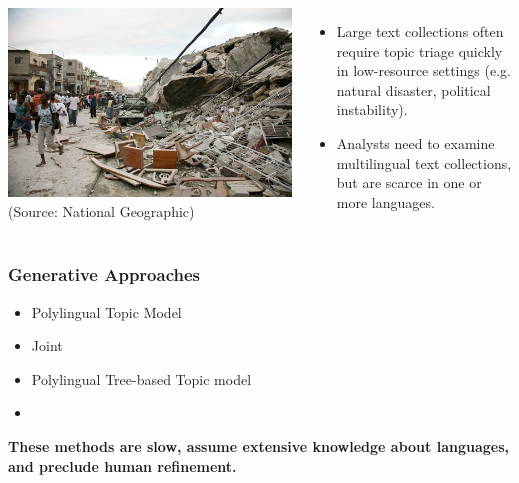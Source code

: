 \begin{frame}

  \begin{columns}
    \includegraphics[width=1.0\linewidth]{topic_models/mtanchor/haiti}
    \tiny (Source: National Geographic)

  
\begin{itemize}
\item Large text collections often require topic triage quickly in low-resource settings (e.g. natural disaster, political instability). 
\item Analysts need to examine multilingual text collections, but are scarce in one or more languages.
\end{itemize}
\end{columns}
\end{frame}


\begin{frame}
  \frametitle{Generative Approaches}
\begin{itemize}
\item Polylingual Topic Model~\cite{mimno-2009}
\item Joint~\cite{jagarlamudi-2010}
\item Polylingual Tree-based Topic model~\cite{hu-2014-ptlda} 
\item {}~\cite{shi-2016} \pause
\vspace{1cm}
\end{itemize}
\textbf{These methods are slow, assume extensive knowledge about languages, and preclude human refinement.}
\end{frame}



